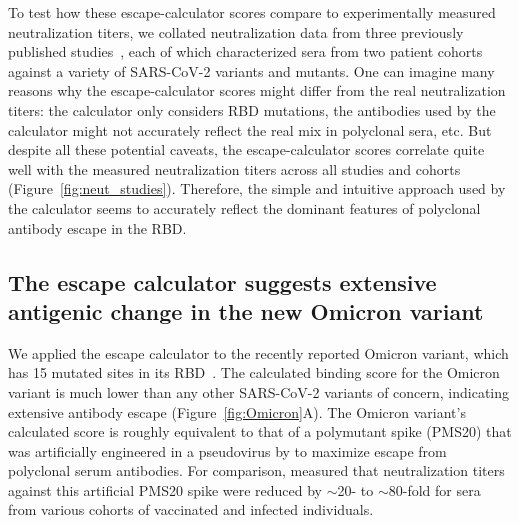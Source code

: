 \documentclass[9pt,twocolumn,twoside]{gsajnl_modified}
\begin{document}
To test how these escape-calculator scores compare to experimentally measured neutralization titers, we collated neutralization data from three previously published studies~\citep{lucas2021impact,uriu2021neutralization,wang2021antibody}, each of which characterized sera from two patient cohorts against a variety of SARS-CoV-2 variants and mutants.
One can imagine many reasons why the escape-calculator scores might differ from the real neutralization titers: the calculator only considers RBD mutations, the antibodies used by the calculator might not accurately reflect the real mix in polyclonal sera, etc.
But despite all these potential caveats, the escape-calculator scores correlate quite well with the measured neutralization titers across all studies and cohorts (Figure~\ref{fig:neut_studies}).
Therefore, the simple and intuitive approach used by the calculator seems to accurately reflect the dominant features of polyclonal antibody escape in the RBD.

\subsection{The escape calculator suggests extensive antigenic change in the new Omicron variant}
We applied the escape calculator to the recently reported Omicron variant, which has 15 mutated sites in its RBD~\citep{ngs-sa2021update,deoliveira2021tweet}.
The calculated binding score for the Omicron variant is much lower than any other SARS-CoV-2 variants of concern, indicating extensive antibody escape (Figure~\ref{fig:Omicron}A).
The Omicron variant's calculated score is roughly equivalent to that of a polymutant spike (PMS20) that was artificially engineered in a pseudovirus by \citet{schmidt2021high} to maximize escape from polyclonal serum antibodies.
For comparison, \citet{schmidt2021high} measured that neutralization titers against this artificial PMS20 spike were reduced by $\sim$20- to $\sim$80-fold for sera from various cohorts of vaccinated and infected individuals.
\end{document}
